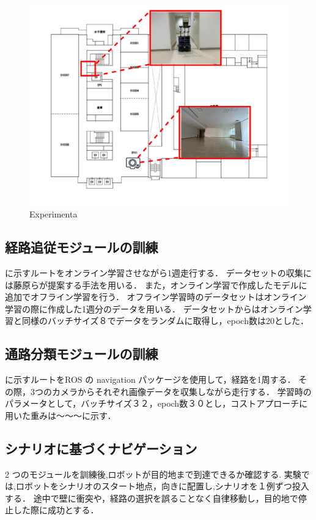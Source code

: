 \begin{figure}[htbp]
  \centering
  \includegraphics[width=130mm]{images/pdf/ishiguro/cit3f.pdf}
  \caption{Experimenta}
  \label{fig:cit3f}
\end{figure}

\subsection{経路追従モジュールの訓練}
に示すルートをオンライン学習させながら1週走行する．
データセットの収集には藤原ら\cite{fujiwara2023}が提案する手法を用いる．
また，オンライン学習で作成したモデルに追加でオフライン学習を行う．
オフライン学習時のデータセットはオンライン学習の際に作成した1週分のデータを用いる．
データセットからはオンライン学習と同様のバッチサイズ８でデータをランダムに取得し，epoch数は20とした．

\subsection{通路分類モジュールの訓練}
に示すルートをROS の navigation パッケージを使用して，経路を1周する．
その際，3つのカメラからそれぞれ画像データを収集しながら走行する．
学習時のパラメータとして，バッチサイズ３２，epoch数３０とし，コストアプローチに用いた重みは～～～に示す．

\subsection{シナリオに基づくナビゲーション}
2 つのモジュールを訓練後,ロボットが目的地まで到達できるか確認する.
実験では,ロボットをシナリオのスタート地点，向きに配置し,シナリオを１例ずつ投入する．
途中で壁に衝突や，経路の選択を誤ることなく自律移動し，目的地で停止した際に成功とする．